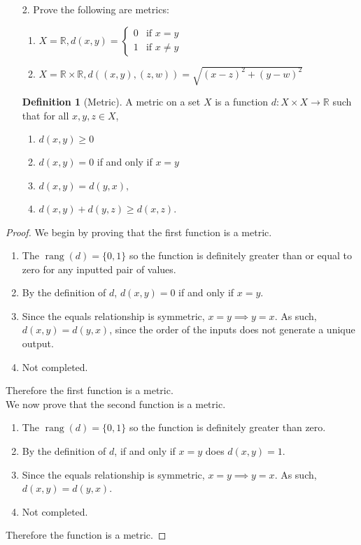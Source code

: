 \documentclass[10pt]{article}
\theoremstyle{definition}
\newtheorem{definition}[equation]{Definition}
\theoremstyle{plain}
\newcommand{\R}{\mathbb{R}}
\DeclareMathOperator\rang{rang}
\begin{document}
\begin{enumerate}
  \item[2.] Prove the following are metrics:
  \begin{enumerate}
    \item $X = \R, d(x,y) =  \begin{cases} 0 & \mbox{if } x = y \\ 1 & \mbox{if } x \neq y \end{cases} $
    \item $X = \R \times \R, d((x,y),(z,w)) = \sqrt{(x-z)^2 + (y-w)^2}$
  \end{enumerate}
  \begin{definition}[Metric]
    A metric on a set $X$ is a function $d: X \times X \to \R$ such that for all $x,y,z \in X$,
  \end{definition}
  \begin{enumerate}
    \item $d(x,y) \geq 0$
    \item $d(x,y) = 0$ if and only if $x = y$
    \item $d(x,y) = d(y,x),$
    \item $d(x,y) + d(y,z) \geq d(x,z)$.
  \end{enumerate}
\end{enumerate}



\begin{proof}
  We begin by proving that the first function is a metric.
  \begin{enumerate}
    \item The $\rang(d)=\{0,1\}$ so the function is definitely greater than or equal to zero for any inputted pair of values.
    \item By the definition of $d$, $d(x,y)=0$ if and only if $x=y$.
    \item Since the equals relationship is symmetric, $x=y \implies y=x$. As such, $d(x,y) = d(y,x)$, since the order of the inputs does not generate a unique output.
    \item Not completed.
  \end{enumerate}
  Therefore the first function is a metric. \\

  We now prove that the second function is a metric.
  \begin{enumerate}
    \item The $\rang(d)=\{0,1\}$ so the function is definitely greater than zero.
    \item By the definition of $d$, if and only if $x=y$ does $d(x,y)=1$.
    \item Since the equals relationship is symmetric, $x=y \implies y=x$. As such, $d(x,y) = d(y,x)$.
    \item Not completed.
  \end{enumerate}
  Therefore the function is a metric.
\end{proof}
\end{document}
